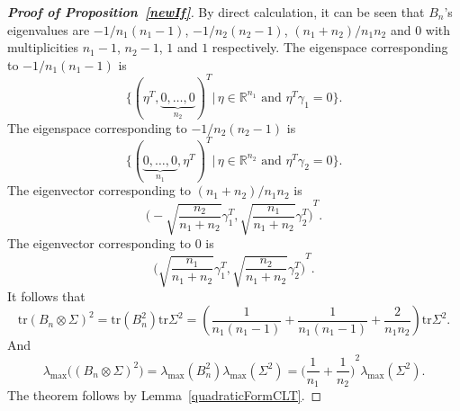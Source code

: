 \documentclass[review]{elsarticle}
\theoremstyle{plain}
\theoremstyle{definition}
\theoremstyle{remark}
\begin{document}
\begin{proof}[\textbf{Proof of Proposition~\ref{newIf}}]
    By direct calculation, it can be seen that $B_n$'s eigenvalues are $-1/n_1(n_1-1)$, $-1/n_2(n_2-1)$, $(n_1+n_2)/n_1 n_2$ and $0$ with multiplicities $n_1-1$, $n_2-1$, $1$ and $1$ respectively.
    The eigenspace corresponding to $-1/n_1(n_1-1)$ is
    \begin{equation*}
        \{{(\eta^T,\underbrace{0,\ldots,0}_{n_2})}^T|\, \textrm{$\eta\in \mathbb{R}^{n_1}$ and $\eta^T \gamma_1=0$}\}.
    \end{equation*}
    The eigenspace corresponding to $-1/n_2(n_2-1)$ is
    \begin{equation*}
        \{{(\underbrace{0,\ldots,0}_{n_1},\eta^T)}^T| \, \textrm{$\eta\in\mathbb{R}^{n_2}$ and $\eta^T \gamma_2=0$}\}.
    \end{equation*}
    The eigenvector corresponding to $(n_1+n_2)/n_1n_2$ is
    \begin{equation*}
        {\Big(-\sqrt{\frac{n_2}{n_1+n_2}}\gamma_1^T, \sqrt{\frac{n_1}{n_1+n_2}}\gamma_2^T\Big)}^T.
    \end{equation*}
    The eigenvector corresponding to $0$ is
    \begin{equation*}
        {\Big(\sqrt{\frac{n_1}{n_1+n_2}}\gamma_1^T, \sqrt{\frac{n_2}{n_1+n_2}}\gamma_2^T\Big)}^T.
    \end{equation*}
It follows that 
    \begin{equation*}
        \mathrm{tr}{(B_n\otimes \Sigma)}^2=\mathrm{tr}(B_n^2)\mathrm{tr}\Sigma^2=(\frac{1}{n_1(n_1-1)}+\frac{1}{n_1(n_1-1)}+\frac{2}{n_1 n_2})\mathrm{tr}\Sigma^2.
    \end{equation*}
And
    \begin{equation*}
        \lambda_{\max}\Big({(B_n\otimes \Sigma)}^2\Big)=\lambda_{\max}(B_n^2)\lambda_{\max}(\Sigma^2)={\Big(\frac{1}{n_1}+\frac{1}{n_2}\Big)}^2\lambda_{\max}(\Sigma^2).
    \end{equation*}
    The theorem follows by Lemma~\ref{quadraticFormCLT}.
\end{proof}
\end{document}
